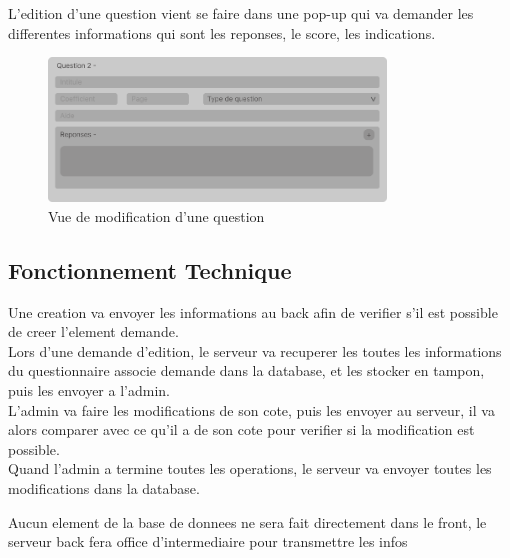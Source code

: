\documentclass{extarticle}
\begin{document}
L'edition d'une question vient se faire dans une pop-up qui va demander les differentes informations qui sont les reponses, le score, les indications.

\begin{figure}[h]
    \centering
    \includegraphics[width=0.8\textwidth]{questionVue.png}
    \caption{Vue de modification d'une question}
    \label{fig:EditQuestionnaire}
\end{figure}

\subsection{Fonctionnement Technique}
Une creation va envoyer les informations au back afin de verifier s'il est possible de creer l'element demande.\\
Lors d'une demande d'edition, le serveur va recuperer les toutes les informations du questionnaire associe demande dans la database, et les stocker en tampon, puis les envoyer a l'admin.\\
L'admin va faire les modifications de son cote, puis les envoyer au serveur, il va alors comparer avec ce qu'il a de son cote pour verifier si la modification est possible.\\
Quand l'admin a termine toutes les operations, le serveur va envoyer toutes les modifications dans la database.

Aucun element de la base de donnees ne sera fait directement dans le front, le serveur back fera office d'intermediaire pour transmettre les infos
\end{document}
